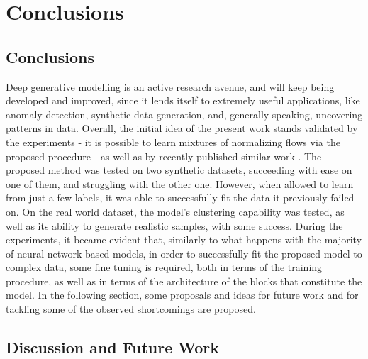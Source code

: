 \chapter{Conclusions}
\label{chapter:conclusions}

\section{Conclusions}
\label{section:conclusions}
Deep generative modelling is an active research avenue, and will keep being
developed and improved, since it lends itself to extremely useful applications,
like anomaly detection, synthetic data generation, and, generally speaking,
uncovering patterns in data.
Overall, the initial idea of the present work stands validated by the experiments - 
it is possible to learn mixtures of normalizing flows via the proposed procedure - as well
as by recently published similar work \autocites{RAD}{semisuplearning_nflows}.
The proposed method was tested on two synthetic datasets, succeeding with ease
on one of them, and struggling with the other one. However, when allowed to learn
from just a few labels, it was able to successfully fit the data it previously
failed on. On the real world dataset, the model's clustering capability was tested,
as well as its ability to generate realistic samples, with some success.
During the experiments, it became evident that, similarly to what happens with
the majority of neural-network-based models, in order to successfully fit the
proposed model to complex data, some fine tuning is required, both in terms of the
training procedure, as well as in terms of the architecture of the blocks that
constitute the model. In the following section, some proposals and ideas for
future work and for tackling some of the observed shortcomings are proposed.

\section{Discussion and Future Work}
\label{section:future}

